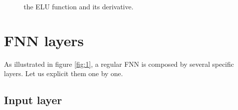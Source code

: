 \begin{figure}[H]
\begin{center}
\end{center}
\caption{\label{fig:elu} the ELU function and its derivative.}
\end{figure}



\section{FNN layers}

As illustrated in figure \ref{fig:1}, a regular FNN is composed by several specific layers. Let us explicit them one by one.



\subsection{Input layer}

